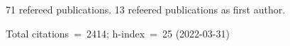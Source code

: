 71 refereed publications. 13 refeered publications as first author.

Total citations~=~2414; h-index~=~25 (2022-03-31)
